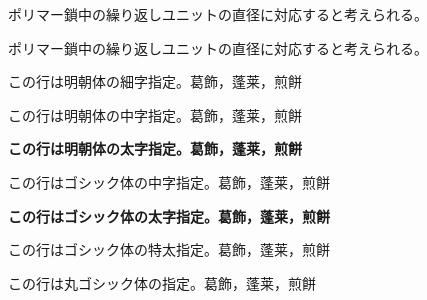 \documentclass[a4paper,11pt]{jlreq}
\begin{document}




ポリマー鎖中の繰り返しユニットの直径に対応すると考えられる。


ポリマー鎖中の繰り返しユニットの直径に対応すると考えられる。






\mcfamily
{\ltseries この行は明朝体の細字指定。葛飾，蓬莱，煎餅}

{\mdseries この行は明朝体の中字指定。葛飾，蓬莱，煎餅}

{\bfseries この行は明朝体の太字指定。葛飾，蓬莱，煎餅}

\gtfamily
{\mdseries この行はゴシック体の中字指定。葛飾，蓬莱，煎餅}

{\bfseries この行はゴシック体の太字指定。葛飾，蓬莱，煎餅}

{\ebseries この行はゴシック体の特太指定。葛飾，蓬莱，煎餅}

\mgfamily
この行は丸ゴシック体の指定。葛飾，蓬莱，煎餅
\normalfont
\end{document}
